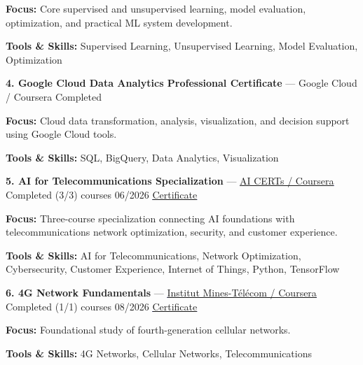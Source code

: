 \documentclass[9pt,letterpaper]{extarticle}
\begin{document}
\textbf{Focus:} Core supervised and unsupervised learning, model evaluation, optimization, and practical ML system development.\par
{\small\textbf{Tools \& Skills:} Supervised Learning, Unsupervised Learning, Model Evaluation, Optimization\par}
\vspace{2pt}
\noindent\textbf{4. Google Cloud Data Analytics Professional Certificate} {\small --- Google Cloud / Coursera \textbar{} Completed}\par
\textbf{Focus:} Cloud data transformation, analysis, visualization, and decision support using Google Cloud tools.\par
{\small\textbf{Tools \& Skills:} SQL, BigQuery, Data Analytics, Visualization\par}
\vspace{2pt}
\noindent\textbf{5. AI for Telecommunications Specialization} {\small --- \textcolor{blue}{\underline{\href{https://coursera.org/verify/specialization/D8Y6MVC0XM51}{AI CERTs / Coursera}}} \textbar{} Completed (3/3) courses \textbar{} 06/2026 \textbar{} \textcolor{blue}{\underline{\href{https://waseemraza844.github.io/portfolio/certificates/wireless/ai-for-telecom.pdf}{Certificate}}}}\par
\textbf{Focus:} Three-course specialization connecting AI foundations with telecommunications network optimization, security, and customer experience.\par
{\small\textbf{Tools \& Skills:} AI for Telecommunications, Network Optimization, Cybersecurity, Customer Experience, Internet of Things, Python, TensorFlow\par}
\vspace{2pt}
\noindent\textbf{6. 4G Network Fundamentals} {\small --- \textcolor{blue}{\underline{\href{https://coursera.org/verify/DLW1YN474VZJ}{Institut Mines-Télécom / Coursera}}} \textbar{} Completed (1/1) courses \textbar{} 08/2026 \textbar{} \textcolor{blue}{\underline{\href{https://waseemraza844.github.io/portfolio/certificates/wireless/4g-network-fundamentals.pdf}{Certificate}}}}\par
\textbf{Focus:} Foundational study of fourth-generation cellular networks.\par
{\small\textbf{Tools \& Skills:} 4G Networks, Cellular Networks, Telecommunications\par}
\vspace{2pt}
\end{document}
